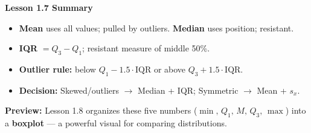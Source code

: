\documentclass[aspectratio=169, 11pt]{beamer}
\begin{document}
{
\begin{frame}[plain]
  \vspace{1.6cm}
  \hspace{0.55cm}%
  \begin{minipage}{0.9\textwidth}
    {\color{goldacc}\bfseries\large Lesson 1.7 Summary}\\[0.6cm]
    \small\color{white}
    \begin{itemize}\setlength{\itemsep}{0.5em}
      \item \textbf{Mean} uses all values; pulled by outliers.
            \textbf{Median} uses position; resistant.
      \item \textbf{IQR} $= Q_3 - Q_1$; resistant measure of middle 50\%.
      \item \textbf{Outlier rule:} below $Q_1 - 1.5\cdot\text{IQR}$ or above
            $Q_3 + 1.5\cdot\text{IQR}$.
      \item \textbf{Decision:} Skewed/outliers $\to$ Median + IQR;\quad
            Symmetric $\to$ Mean + $s_x$.
    \end{itemize}
    \vspace{0.6cm}
    {\color{skymid}\bfseries\small Preview:}
    {\color{white}\small Lesson 1.8 organizes these five numbers
    ($\min,\,Q_1,\,M,\,Q_3,\,\max$) into a \textbf{boxplot} --- a powerful
    visual for comparing distributions.}
  \end{minipage}
\end{frame}
}
\end{document}
